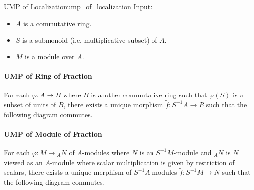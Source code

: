 \documentclass{article}
\begin{document}
\begin{proposition}{UMP of Localization}{ump_of_localization}
    Input:
    \begin{itemize}
        \item $A$ is a commutative ring.
        \item $S$ is a submonoid (i.e. multiplicative subset) of $A$.
        \item $M$ is a module over $A$.
    \end{itemize}
    \paragraph*{UMP of Ring of Fraction}
    For each $\varphi:A\rightarrow B$ where $B$ is another commutative ring such that $\varphi(S)$ is a subset of units of $B$, there exists a unique morphism $\tilde{f}:S^{-1}A \rightarrow B$ such that the following diagram commutes.
    \begin{center}
    \end{center}
    \paragraph*{UMP of Module of Fraction}
    For each $\varphi:M\rightarrow {_A N}$ of $A$-modules where $N$ is an $S^{-1}M$-module and ${_A N}$ is $N$ viewed as an $A$-module where scalar multiplication is given by restriction of scalars, there exists a unique morphism of $S^{-1}A$ modules $\tilde{f}:S^{-1}M \rightarrow N$ such that the following diagram commutes.
    \begin{center}
    \end{center}
\end{proposition}
\end{document}
